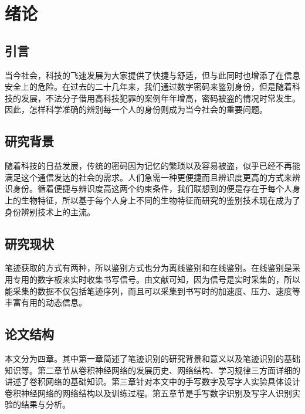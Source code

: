 
\chapter{绪论}
\label{cha:introduction}
\section{引言}
\label{sec:background}
当今社会，科技的飞速发展为大家提供了快捷与舒适，但与此同时也增添了在信息安全上的危险。在过去的二十几年来，我们通过数字密码来鉴别身份，但是随着科技的发展，不法分子借用高科技犯罪的案例年年增高，密码被盗的情况时常发生。因此，怎样科学准确的辨别每一个人的身份则成为当今社会的重要问题。
\section{研究背景}
\label{sec:related_work}
随着科技的日益发展，传统的密码因为记忆的繁琐以及容易被盗，似乎已经不再能满足这个通信发达的社会的需求。人们急需一种更便捷而且辨识度更高的方式来辨识身份。循着便捷与辨识度高这两个约束条件，我们联想到的便是存在于每个人身上的生物特征，所以基于每个人身上不同的生物特征而研究的鉴别技术现在成为了身份辨别技术上的主流。

\section{研究现状}
笔迹获取的方式有两种，所以鉴别方式也分为离线鉴别和在线鉴别。在线鉴别是采用专用的数字板来实时收集书写信号。由文献\cite{ref4,ref5,ref6,ref7}可知，因为信号是实时采集的，所以能采集的数据不仅包括笔迹序列，而且可以采集到书写时的加速度、压力、速度等丰富有用的动态信息。

\section{论文结构}
本文分为四章。其中第一章简述了笔迹识别的研究背景和意义以及笔迹识别的基础知识等。第二章节从卷积神经网络的发展历史、网络结构、学习规律三方面详细的讲述了卷积网络的基础知识。第三章针对本文中的手写数字及写字人实验具体设计卷积神经网络的网络结构以及训练过程。第五章节是手写数字识别及写字人识别实验的结果与分析。